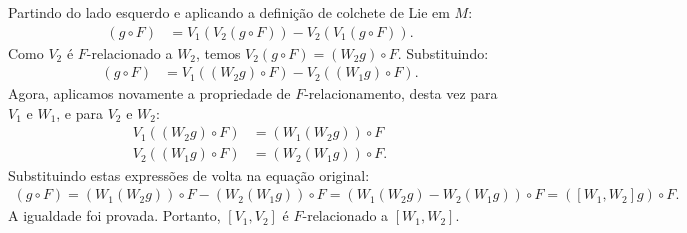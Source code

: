 {	Partindo do lado esquerdo e aplicando a definição de colchete de Lie em $M$:
	\begin{align*}
		[V_1, V_2](g \circ F) &= V_1(V_2(g \circ F)) - V_2(V_1(g \circ F)).
	\end{align*}
	Como $V_2$ é $F$-relacionado a $W_2$, temos $V_2(g \circ F) = (W_2 g) \circ F$. Substituindo:
	\begin{align*}
		[V_1, V_2](g \circ F) &= V_1((W_2 g) \circ F) - V_2((W_1 g) \circ F).
	\end{align*}
	Agora, aplicamos novamente a propriedade de $F$-relacionamento, desta vez para $V_1$ e $W_1$, e para $V_2$ e $W_2$:
	\begin{align*}
		V_1((W_2 g) \circ F) &= (W_1(W_2 g)) \circ F \\
		V_2((W_1 g) \circ F) &= (W_2(W_1 g)) \circ F.
	\end{align*}
	Substituindo estas expressões de volta na equação original:
	\begin{align*}
		[V_1, V_2](g \circ F) = (W_1(W_2 g)) \circ F - (W_2(W_1 g)) \circ F 
		= (W_1(W_2 g) - W_2(W_1 g)) \circ F 
		= ([W_1, W_2]g) \circ F.
	\end{align*}
	A igualdade foi provada. Portanto, $[V_1, V_2]$ é $F$-relacionado a $[W_1, W_2]$.
}
